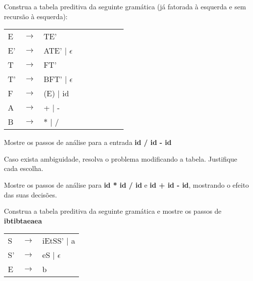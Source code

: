 \documentclass{compiladores}
\begin{document}
\begin{listanumerada}
\item Construa a tabela preditiva da seguinte gramática (já fatorada à
  esquerda e sem recursão à esquerda): \\
     \begin{tabularx}{\linewidth}{lcllcllcl}
     E  & $\rightarrow$ & TE'             \\
     E' & $\rightarrow$ & ATE' | $\epsilon$ \\
     T  & $\rightarrow$ & FT' \\
     T' & $\rightarrow$ & BFT' | $\epsilon$ \\
     F  & $\rightarrow$ & (E) | id \\
     A  & $\rightarrow$ & + | - \\
     B  & $\rightarrow$ & $*$ | $/$
     \end{tabularx}
     \begin{lista}
       \item Mostre os passos de análise para a entrada {\bf id / id - id}
       \item Caso exista ambiguidade, resolva o problema modificando a
         tabela. Justifique cada escolha.
       \item Mostre os passos de análise para {\bf id * id / id} e
         {\bf id + id - id}, mostrando o efeito das suas decisões.
     \end{lista}

\item Construa a tabela preditiva da seguinte gramática e mostre os passos de {\bf ibtibtaeaea} \\
    \begin{tabular}{lcl}
     S & $\rightarrow$ & iEtSS' | a \\
     S' & $\rightarrow$ & eS | $\epsilon$ \\
     E & $\rightarrow$ & b\\
     \end{tabular}


\end{listanumerada}
\end{document}
